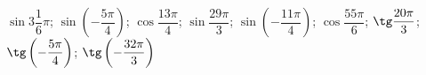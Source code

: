 \begin{ex}[type=calculate]
	\begin{condition}
		 \( \sin3\dfrac{1}{6}\pi \); \( \sin\left( -\dfrac{5\pi}{4} \right) \); \( \cos\dfrac{13\pi}{4} \); \( \sin\dfrac{29\pi}{3} \); \( \sin\left( -\dfrac{11\pi}{4}  \right)\); \( \cos\dfrac{55\pi}{6} \);  \( \tg\dfrac{20\pi}{3} \); \( \tg\left( -\dfrac{5\pi}{4}  \right)\); \( \tg\left( -\dfrac{32\pi}{3}  \right)\)
	\end{condition}
\end{ex}